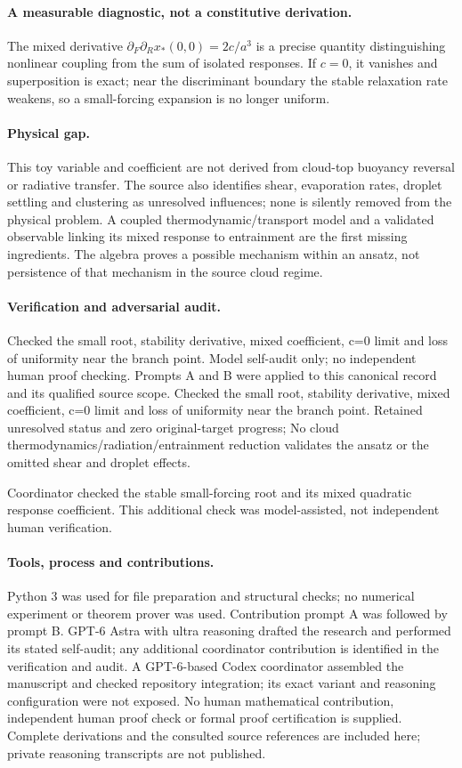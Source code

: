 \documentclass[11pt]{article}
\begin{document}
\paragraph{A measurable diagnostic, not a constitutive derivation.} The mixed derivative $\partial_F\partial_Rx_*(0,0)=2c/a^3$ is a precise quantity distinguishing nonlinear coupling from the sum of isolated responses. If $c=0$, it vanishes and superposition is exact; near the discriminant boundary the stable relaxation rate weakens, so a small-forcing expansion is no longer uniform.

\paragraph{Physical gap.} This toy variable and coefficient are not derived from cloud-top buoyancy reversal or radiative transfer. The source also identifies shear, evaporation rates, droplet settling and clustering as unresolved influences; none is silently removed from the physical problem. A coupled thermodynamic/transport model and a validated observable linking its mixed response to entrainment are the first missing ingredients. The algebra proves a possible mechanism within an ansatz, not persistence of that mechanism in the source cloud regime.

\paragraph{Verification and adversarial audit.}
Checked the small root, stability derivative, mixed coefficient, c=0 limit and loss of uniformity near the branch point. Model self-audit only; no independent human proof checking. Prompts A and B were applied to this canonical record and its qualified source scope. Checked the small root, stability derivative, mixed coefficient, c=0 limit and loss of uniformity near the branch point. Retained unresolved status and zero original-target progress; No cloud thermodynamics/radiation/entrainment reduction validates the ansatz or the omitted shear and droplet effects.

Coordinator checked the stable small-forcing root and its mixed quadratic response coefficient. This additional check was model-assisted, not independent human verification.

\paragraph{Tools, process and contributions.}
Python 3 was used for file preparation and structural checks; no numerical experiment or theorem prover was used. Contribution prompt A was followed by prompt B. GPT-6 Astra with ultra reasoning drafted the research and performed its stated self-audit; any additional coordinator contribution is identified in the verification and audit. A GPT-6-based Codex coordinator assembled the manuscript and checked repository integration; its exact variant and reasoning configuration were not exposed. No human mathematical contribution, independent human proof check or formal proof certification is supplied. Complete derivations and the consulted source references are included here; private reasoning transcripts are not published.
\end{document}
